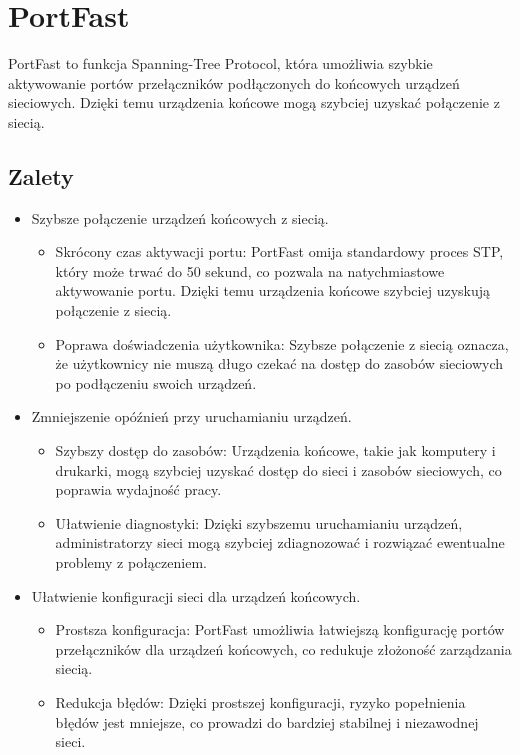 \section{PortFast}

PortFast to funkcja Spanning-Tree Protocol, która umożliwia szybkie aktywowanie portów przełączników podłączonych do końcowych urządzeń sieciowych. Dzięki temu urządzenia końcowe mogą szybciej uzyskać połączenie z siecią.

\subsection{Zalety}
\begin{itemize}
    \item Szybsze połączenie urządzeń końcowych z siecią.
    \begin{itemize}
        \item Skrócony czas aktywacji portu: PortFast omija standardowy proces STP, który może trwać do 50 sekund, co pozwala na natychmiastowe aktywowanie portu. Dzięki temu urządzenia końcowe szybciej uzyskują połączenie z siecią.
        \item Poprawa doświadczenia użytkownika: Szybsze połączenie z siecią oznacza, że użytkownicy nie muszą długo czekać na dostęp do zasobów sieciowych po podłączeniu swoich urządzeń.
    \end{itemize}
    \item Zmniejszenie opóźnień przy uruchamianiu urządzeń.
    \begin{itemize}
        \item Szybszy dostęp do zasobów: Urządzenia końcowe, takie jak komputery i drukarki, mogą szybciej uzyskać dostęp do sieci i zasobów sieciowych, co poprawia wydajność pracy.
        \item Ułatwienie diagnostyki: Dzięki szybszemu uruchamianiu urządzeń, administratorzy sieci mogą szybciej zdiagnozować i rozwiązać ewentualne problemy z połączeniem.
    \end{itemize}
    \item Ułatwienie konfiguracji sieci dla urządzeń końcowych.
    \begin{itemize}
        \item Prostsza konfiguracja: PortFast umożliwia łatwiejszą konfigurację portów przełączników dla urządzeń końcowych, co redukuje złożoność zarządzania siecią.
        \item Redukcja błędów: Dzięki prostszej konfiguracji, ryzyko popełnienia błędów jest mniejsze, co prowadzi do bardziej stabilnej i niezawodnej sieci.
    \end{itemize}
\end{itemize}

